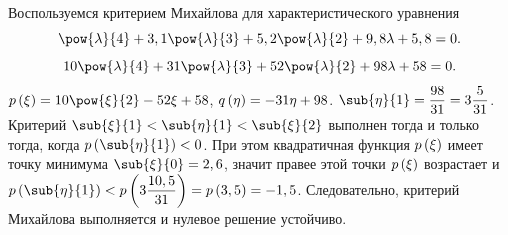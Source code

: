 \documentclass[a5paper,10pt]{article}
\begin{document}
Воспользуемся критерием Михайлова для характеристического уравнения 
$$\pow{\lambda}{4} + 3,1\pow{\lambda}{3} + 5,2 \pow{\lambda}{2} + 9,8\lambda + 5,8 = 0.$$
$$10\pow{\lambda}{4} + 31\pow{\lambda}{3} + 52 \pow{\lambda}{2} + 98\lambda + 58 = 0.$$
$p\br{\xi} = 10\pow{\xi}{2} - 52\xi + 58$,
$q\left(\hspace{0.01em}\eta\hspace{0.01em}\right) = -31\eta + 98$.
$\sub{\eta}{1} = \dfrac {98} {31} = 3 \dfrac {5}{31}$.
Критерий $\sub{\xi}{1} < \sub{\eta}{1} < \sub{\xi}{2}$
выполнен тогда и только тогда, когда $p\br{\sub{\eta}{1}} < 0$.
При этом квадратичная функция $p\left(\hspace{0.01em}\xi\hspace{0.01em}\right)$ имеет точку минимума 
$\sub{\xi}{0} = 2,6$, значит правее этой точки $p\left(\hspace{0.01em}\xi\hspace{0.01em}\right)$ возрастает и
$p\br{\sub{\eta}{1}} < p\br{3 \dfrac {10,5} {31}} = p\br{3,5} = -1,5$.
Следовательно, критерий Михайлова выполняется и нулевое решение устойчиво.
\end{document}
